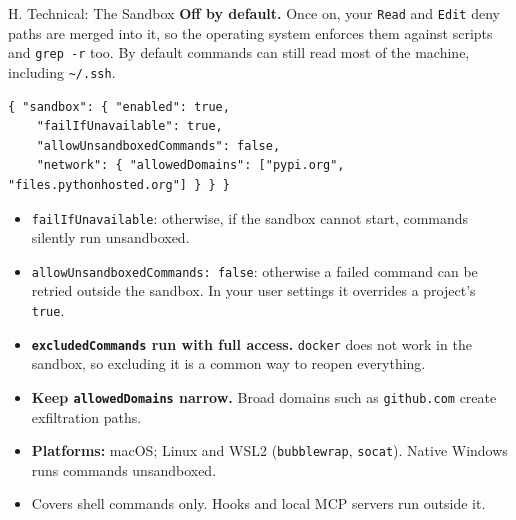\documentclass[aspectratio=169, 11pt]{beamer}
\begin{document}
\begin{frame}[fragile]{H. Technical: The Sandbox}
  \footnotesize
  \textbf{Off by default.} Once on, your \texttt{Read} and \texttt{Edit} deny paths are merged into it, so the operating system enforces them against scripts and \texttt{grep -r} too. By default commands can still read most of the machine, including \texttt{\textasciitilde/.ssh}.
  \begin{lstlisting}[basicstyle=\ttfamily\tiny]
{ "sandbox": { "enabled": true,
    "failIfUnavailable": true,
    "allowUnsandboxedCommands": false,
    "network": { "allowedDomains": ["pypi.org", "files.pythonhosted.org"] } } }
  \end{lstlisting}
  \vspace{-0.4em}
  \begin{itemize}\footnotesize
    \item \texttt{failIfUnavailable}: otherwise, if the sandbox cannot start, commands silently run unsandboxed.
    \item \texttt{allowUnsandboxedCommands: false}: otherwise a failed command can be retried outside the sandbox. In your user settings it overrides a project's \texttt{true}.
    \item \textbf{\texttt{excludedCommands} run with full access.} \texttt{docker} does not work in the sandbox, so excluding it is a common way to reopen everything.
    \item \textbf{Keep \texttt{allowedDomains} narrow.} Broad domains such as \texttt{github.com} create exfiltration paths.
    \item \textbf{Platforms:} macOS; Linux and WSL2 (\texttt{bubblewrap}, \texttt{socat}). \alert{Native Windows runs commands unsandboxed.}
    \item Covers shell commands only. Hooks and local MCP servers run outside it.
  \end{itemize}
\end{frame}
\end{document}
